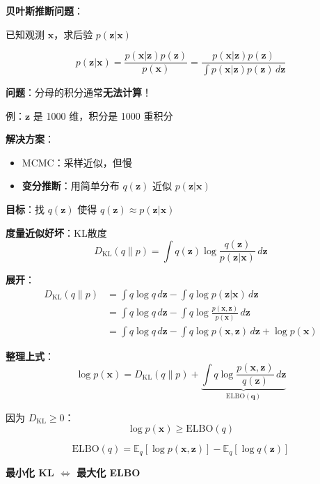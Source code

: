 \documentclass[12pt, a4paper]{ctexart}
\begin{document}
\begin{blackboard}[变分推断的动机]

\textbf{贝叶斯推断问题}：

已知观测 $\mathbf{x}$，求后验 $p(\mathbf{z} | \mathbf{x})$

\[
p(\mathbf{z} | \mathbf{x}) = \frac{p(\mathbf{x} | \mathbf{z}) p(\mathbf{z})}{p(\mathbf{x})} = \frac{p(\mathbf{x} | \mathbf{z}) p(\mathbf{z})}{\int p(\mathbf{x} | \mathbf{z}) p(\mathbf{z}) \, d\mathbf{z}}
\]

\textbf{问题}：分母的积分通常\textbf{无法计算}！

例：$\mathbf{z}$ 是 1000 维，积分是 1000 重积分

\textbf{解决方案}：
\begin{itemize}
    \item MCMC：采样近似，但慢
    \item \textbf{变分推断}：用简单分布 $q(\mathbf{z})$ 近似 $p(\mathbf{z} | \mathbf{x})$
\end{itemize}

\end{blackboard}

\begin{blackboard}

\textbf{目标}：找 $q(\mathbf{z})$ 使得 $q(\mathbf{z}) \approx p(\mathbf{z} | \mathbf{x})$

\textbf{度量近似好坏}：KL散度
\[
D_{\text{KL}}(q \| p) = \int q(\mathbf{z}) \log \frac{q(\mathbf{z})}{p(\mathbf{z} | \mathbf{x})} \, d\mathbf{z}
\]

\textbf{展开}：
\begin{align*}
D_{\text{KL}}(q \| p) &= \int q \log q \, d\mathbf{z} - \int q \log p(\mathbf{z} | \mathbf{x}) \, d\mathbf{z} \\
&= \int q \log q \, d\mathbf{z} - \int q \log \frac{p(\mathbf{x}, \mathbf{z})}{p(\mathbf{x})} \, d\mathbf{z} \\
&= \int q \log q \, d\mathbf{z} - \int q \log p(\mathbf{x}, \mathbf{z}) \, d\mathbf{z} + \log p(\mathbf{x})
\end{align*}

\end{blackboard}

\begin{blackboard}

\textbf{整理上式}：
\[
\log p(\mathbf{x}) = D_{\text{KL}}(q \| p) + \underbrace{\int q \log \frac{p(\mathbf{x}, \mathbf{z})}{q(\mathbf{z})} \, d\mathbf{z}}_{\text{ELBO}(\mathbf{q})}
\]

因为 $D_{\text{KL}} \geq 0$：
\[
\log p(\mathbf{x}) \geq \text{ELBO}(q)
\]

\begin{keypoint}[ELBO]
\[
\boxed{\text{ELBO}(q) = \mathbb{E}_q[\log p(\mathbf{x}, \mathbf{z})] - \mathbb{E}_q[\log q(\mathbf{z})]}
\]

\textbf{最小化 KL $\Leftrightarrow$ 最大化 ELBO}
\end{keypoint}

\end{blackboard}
\end{document}

